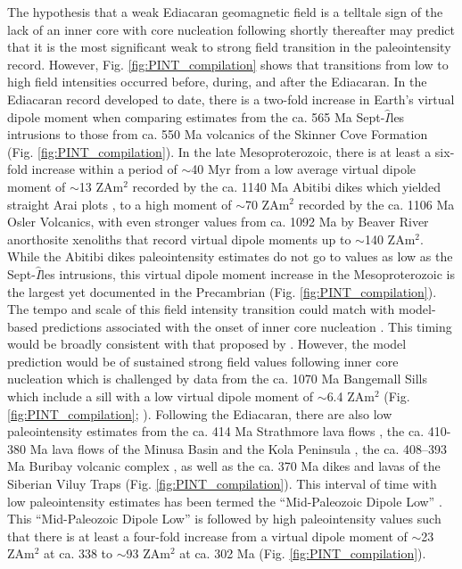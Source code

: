\documentclass[9pt,twocolumn,twoside,lineno]{pnas-new}
\begin{document}
The hypothesis that a weak Ediacaran geomagnetic field is a telltale sign of the lack of an inner core with core nucleation following shortly thereafter may predict that it is the most significant weak to strong field transition in the paleointensity record. However, Fig. \ref{fig:PINT_compilation} shows that transitions from low to high field intensities occurred before, during, and after the Ediacaran. In the Ediacaran record developed to date, there is a two-fold increase in Earth's virtual dipole moment when comparing estimates from the ca. 565 Ma Sept-$\hat{I}$les intrusions \cite{Bono2019a} to those from ca. 550 Ma volcanics of the Skinner Cove Formation \cite{Thallner2021a} (Fig. \ref{fig:PINT_compilation}). In the late Mesoproterozoic, there is at least a six-fold increase within a period of $\sim$40 Myr from a low average virtual dipole moment of $\sim$13 ZAm$^2$ recorded by the ca. 1140 Ma Abitibi dikes which yielded straight Arai plots \cite{Macouin2003a}, to a high moment of $\sim$70 ZAm$^2$ recorded by the ca. 1106 Ma Osler Volcanics, with even stronger values from ca. 1092 Ma by Beaver River anorthosite xenoliths that record virtual dipole moments up to $\sim$140 ZAm$^2$. While the Abitibi dikes paleointensity estimates do not go to values as low as the Sept-$\hat{I}$les intrusions, this virtual dipole moment increase in the Mesoproterozoic is the largest yet documented in the Precambrian (Fig. \ref{fig:PINT_compilation}). The tempo and scale of this field intensity transition could match with model-based predictions associated with the onset of inner core nucleation \cite{Davies2021a}. This timing would be broadly consistent with that proposed by \citealp{Biggin2015a}. However, the model prediction would be of sustained strong field values following inner core nucleation which is challenged by data from the ca. 1070 Ma Bangemall Sills which include a sill with a low virtual dipole moment of $\sim$6.4 ZAm$^2$ (Fig. \ref{fig:PINT_compilation};  \citealp{Lloyd2021b}). Following the Ediacaran, there are also low paleointensity estimates from the ca. 414 Ma Strathmore lava flows \cite{Hawkins2021a}, the ca. 410-380 Ma lava flows of the Minusa Basin and the Kola Peninsula \cite{Shcherbakova2017a}, the ca. 408–393 Ma Buribay volcanic complex \cite{Shcherbakova2021a}, as well as the ca. 370 Ma dikes and lavas of the Siberian Viluy Traps \cite{Hawkins2019a} (Fig. \ref{fig:PINT_compilation}). This interval of time with low paleointensity estimates has been termed the ``Mid-Paleozoic Dipole Low'' \cite{Hawkins2021a}. This  ``Mid-Paleozoic Dipole Low'' is followed by high paleointensity values such that there is at least a four-fold increase from a virtual dipole moment of $\sim$23 ZAm$^2$ at ca. 338 to $\sim$93 ZAm$^2$ at ca. 302 Ma (Fig. \ref{fig:PINT_compilation}). 
\end{document}
